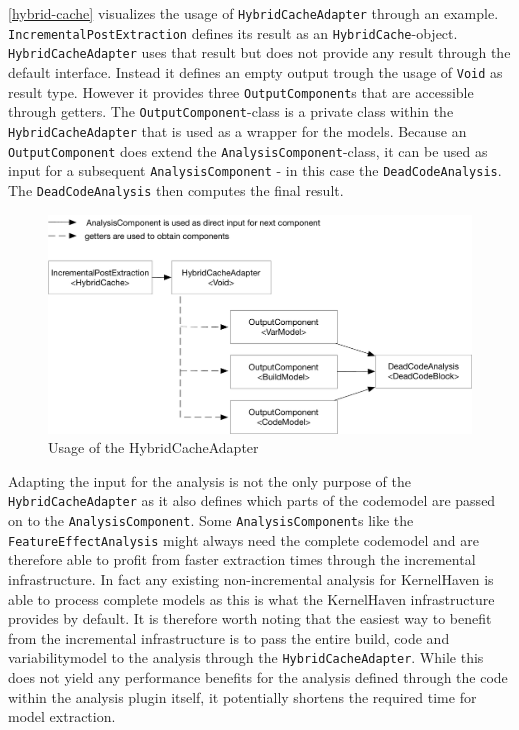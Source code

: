 \documentclass[a4paper]{article}
\begin{document}
\autoref{hybrid-cache} visualizes the usage of \texttt{HybridCacheAdapter} through an example. \texttt{IncrementalPostExtraction} defines its result as an \texttt{HybridCache}-object. \texttt{HybridCacheAdapter} uses that result but does not provide any result through the default interface. Instead it defines an empty output trough the usage of \texttt{Void} as result type. However it provides three \texttt{OutputComponent}s that are accessible through getters. The \texttt{OutputComponent}-class is a private class within the \texttt{HybridCacheAdapter} that is used as a wrapper for the models. Because an \texttt{OutputComponent} does extend the \texttt{AnalysisComponent}-class, it can be used as input for a subsequent \texttt{AnalysisComponent} - in this case the \texttt{DeadCodeAnalysis}. The \texttt{DeadCodeAnalysis} then computes the final result.

\begin{figure}[h] 
  \centering
  \begin{minipage}[b]{1\textwidth} 
    \caption[Usage of the HybridCacheAdapter]{Usage of the HybridCacheAdapter}\label{hybrid-cache}
    \includegraphics[width=1\textwidth]{img/HybridCacheAdapter.pdf}
  \end{minipage}
\end{figure}

Adapting the input for the analysis is not the only purpose of the \texttt{HybridCacheAdapter} as it also defines which parts of the codemodel are passed on to the \texttt{AnalysisComponent}. Some  \texttt{AnalysisComponent}s like the \texttt{FeatureEffectAnalysis} \cite{feature-effect-analysis}\cite{Nadi15wheredo} might always need the complete codemodel and are therefore able to profit from faster extraction times through the incremental infrastructure. In fact any existing non-incremental analysis for KernelHaven is able to process complete models as this is what the KernelHaven infrastructure provides by default. It is therefore worth noting that the easiest way to benefit from the incremental infrastructure is to pass the entire build, code and variabilitymodel to the analysis through the \texttt{HybridCacheAdapter}. While this does not yield any performance benefits for the analysis defined through the code within the analysis plugin itself, it potentially shortens the required time for model extraction.
\end{document}
